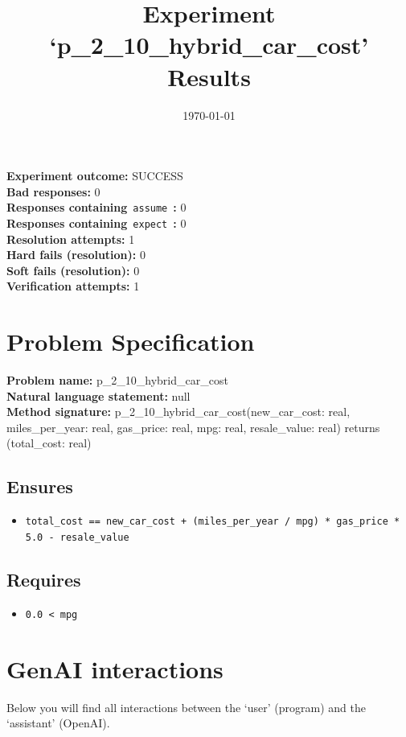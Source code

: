 \documentclass{article}
\begin{document}
\title{Experiment `p\_2\_10\_hybrid\_car\_cost' Results}
\author{\today}
\date{}
\maketitle
\textbf{Experiment outcome: }SUCCESS
\\\textbf{Bad responses: }0
\\\textbf{Responses containing}~\texttt{assume}~\textbf{: }0
\\\textbf{Responses containing}~\texttt{expect}~\textbf{: }0
\\\textbf{Resolution attempts: }1
\\\textbf{Hard fails (resolution): }0
\\\textbf{Soft fails (resolution): }0
\\\textbf{Verification attempts: }1
\section*{Problem Specification}
\textbf{Problem name: }p\_2\_10\_hybrid\_car\_cost
\\\textbf{Natural language statement: }null
\\\textbf{Method signature: }p\_2\_10\_hybrid\_car\_cost(new\_car\_cost: real, miles\_per\_year: real, gas\_price: real, mpg: real, resale\_value: real) returns (total\_cost: real)
\subsection*{Ensures}
\begin{itemize}
\item \texttt{total\_cost == new\_car\_cost + (miles\_per\_year / mpg) * gas\_price * 5.0 - resale\_value}
\end{itemize}
\subsection*{Requires}
\begin{itemize}
\item \texttt{0.0 < mpg}
\end{itemize}
\clearpage
\section*{GenAI interactions}
Below you will find all interactions between the `user' (program) and the `assistant' (OpenAI).
\end{document}
